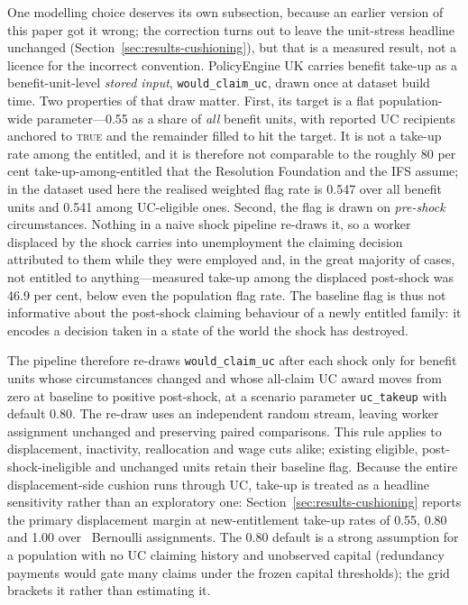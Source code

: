 One modelling choice deserves its own subsection, because an earlier version of this paper got it wrong; the correction turns out to leave the unit-stress headline unchanged (Section~\ref{sec:results-cushioning}), but that is a measured result, not a licence for the incorrect convention. PolicyEngine UK carries benefit take-up as a benefit-unit-level \emph{stored input}, \texttt{would\_claim\_uc}, drawn once at dataset build time. Two properties of that draw matter. First, its target is a flat population-wide parameter---0.55 as a share of \emph{all} benefit units, with reported UC recipients anchored to \textsc{true} and the remainder filled to hit the target. It is not a take-up rate among the entitled, and it is therefore not comparable to the roughly 80 per cent take-up-among-entitled that the Resolution Foundation and the IFS assume; in the dataset used here the realised weighted flag rate is 0.547 over all benefit units and 0.541 among UC-eligible ones. Second, the flag is drawn on \emph{pre-shock} circumstances. Nothing in a naive shock pipeline re-draws it, so a worker displaced by the shock carries into unemployment the claiming decision attributed to them while they were employed and, in the great majority of cases, not entitled to anything---measured take-up among the displaced post-shock was 46.9 per cent, below even the population flag rate. The baseline flag is thus not informative about the post-shock claiming behaviour of a newly entitled family: it encodes a decision taken in a state of the world the shock has destroyed.

The pipeline therefore re-draws \texttt{would\_claim\_uc} after each shock only for benefit units whose circumstances changed and whose all-claim UC award moves from zero at baseline to positive post-shock, at a scenario parameter \texttt{uc\_takeup} with default 0.80. The re-draw uses an independent random stream, leaving worker assignment unchanged and preserving paired comparisons. This rule applies to displacement, inactivity, reallocation and wage cuts alike; existing eligible, post-shock-ineligible and unchanged units retain their baseline flag. Because the entire displacement-side cushion runs through UC, take-up is treated as a headline sensitivity rather than an exploratory one: Section~\ref{sec:results-cushioning} reports the primary displacement margin at new-entitlement take-up rates of 0.55, 0.80 and 1.00 over \TakeupSeeds\ Bernoulli assignments. The 0.80 default is a strong assumption for a population with no UC claiming history and unobserved capital (redundancy payments would gate many claims under the frozen capital thresholds); the grid brackets it rather than estimating it.

